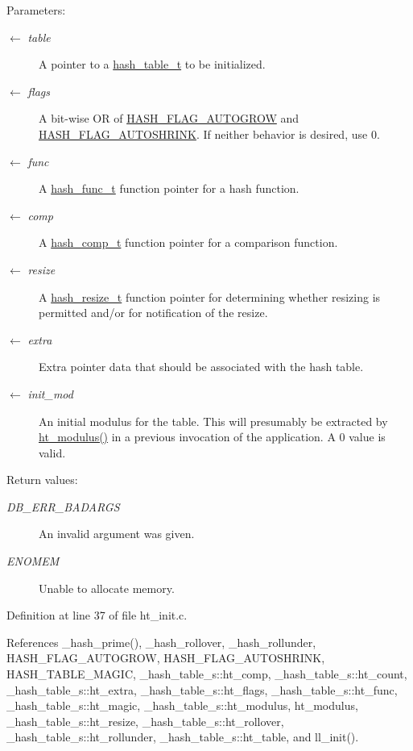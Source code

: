 \begin{Desc}
\item[Parameters:]
\begin{description}
\item[\mbox{$\leftarrow$} {\em table}]A pointer to a \hyperlink{group__dbprim__hash_ga1}{hash\_\-table\_\-t} to be initialized. \item[\mbox{$\leftarrow$} {\em flags}]A bit-wise OR of \hyperlink{group__dbprim__hash_ga23}{HASH\_\-FLAG\_\-AUTOGROW} and \hyperlink{group__dbprim__hash_ga24}{HASH\_\-FLAG\_\-AUTOSHRINK}. If neither behavior is desired, use 0. \item[\mbox{$\leftarrow$} {\em func}]A \hyperlink{group__dbprim__hash_ga4}{hash\_\-func\_\-t} function pointer for a hash function. \item[\mbox{$\leftarrow$} {\em comp}]A \hyperlink{group__dbprim__hash_ga5}{hash\_\-comp\_\-t} function pointer for a comparison function. \item[\mbox{$\leftarrow$} {\em resize}]A \hyperlink{group__dbprim__hash_ga6}{hash\_\-resize\_\-t} function pointer for determining whether resizing is permitted and/or for notification of the resize. \item[\mbox{$\leftarrow$} {\em extra}]Extra pointer data that should be associated with the hash table. \item[\mbox{$\leftarrow$} {\em init\_\-mod}]An initial modulus for the table. This will presumably be extracted by \hyperlink{group__dbprim__hash_ga30}{ht\_\-modulus()} in a previous invocation of the application. A 0 value is valid.\end{description}
\end{Desc}
\begin{Desc}
\item[Return values:]
\begin{description}
\item[{\em DB\_\-ERR\_\-BADARGS}]An invalid argument was given. \item[{\em ENOMEM}]Unable to allocate memory.\end{description}
\end{Desc}


Definition at line 37 of file ht\_\-init.c.

References \_\-hash\_\-prime(), \_\-hash\_\-rollover, \_\-hash\_\-rollunder, HASH\_\-FLAG\_\-AUTOGROW, HASH\_\-FLAG\_\-AUTOSHRINK, HASH\_\-TABLE\_\-MAGIC, \_\-hash\_\-table\_\-s::ht\_\-comp, \_\-hash\_\-table\_\-s::ht\_\-count, \_\-hash\_\-table\_\-s::ht\_\-extra, \_\-hash\_\-table\_\-s::ht\_\-flags, \_\-hash\_\-table\_\-s::ht\_\-func, \_\-hash\_\-table\_\-s::ht\_\-magic, \_\-hash\_\-table\_\-s::ht\_\-modulus, ht\_\-modulus, \_\-hash\_\-table\_\-s::ht\_\-resize, \_\-hash\_\-table\_\-s::ht\_\-rollover, \_\-hash\_\-table\_\-s::ht\_\-rollunder, \_\-hash\_\-table\_\-s::ht\_\-table, and ll\_\-init().

